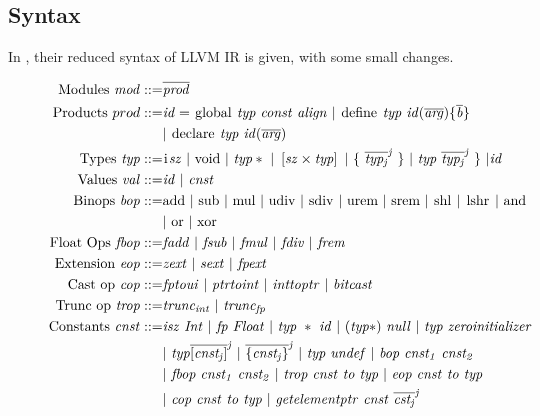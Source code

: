 \newcommand{\kw}[1]{\text{\lsttext{#1}}}
\subsection{Syntax}
In , their reduced syntax of LLVM IR is given, with some small changes.\begin{figure}[!htb]
\begin{align*}
\begin{aligned}
\text{Modules }\mathit{mod} ::= &\overline{\mathit{prod}} \\
\text{Products }prod ::= & \mathit{id =\ }\kw{global}\ \mathit{typ}\ \mathit{const}\ \mathit{align}\ |\ \kw{define} \mathit{\ typ\ id(\overline{arg})\{\overline{b}\}}\\
&|\ \kw{declare} \mathit{\ typ\ id(\overline{arg})} \\
\text{Types } \mathit{typ} ::= &\kw{i} \mathit{sz\ |\ } \kw{void} \mathit{\ |\ typ*\ |\ \left[sz \times typ\right]\ |\ \lbrace\ \overline{typ_{j}}^{j}\ \rbrace\ |\ typ\ \overline{typ_{j}}^{j}\ \rbrace\ | id} \\
\text{Values } \mathit{val} ::= &\mathit{ id\ |\ cnst} \\
\text{Binops } \mathit{bop} ::= &\kw{add} \ |\ \kw{sub}\ |\ \kw{mul}\ |\ \kw{udiv}\ |\ \kw{sdiv}\ |\ \kw{urem}\ |\ \kw{srem}\ |\ \kw{shl}\ |\ \kw{lshr}\ |\ \kw{and}\\
&|\ \kw{or}\ |\ \kw{xor} \\
\text{Float Ops } \mathit{fbop} ::= &\mathit{fadd \ |\ fsub \ |\ fmul \ |\ fdiv \ |\ frem} \\
\text{Extension } \mathit{eop} ::= &\mathit{zext \ |\ sext \ |\ fpext} \\
\text{Cast op } \mathit{cop} ::= &\mathit{fptoui \ |\ ptrtoint \ |\ inttoptr \ |\ bitcast} \\
\text{Trunc op } \mathit{trop} ::= &\mathit{trunc_{int} \ |\ trunc_{fp}} \\
%
%
\text{Constants } \mathit{cnst} ::= &\mathit{isz\ Int\ |\ fp\ Float\ |\ typ\ *\ id\ |\ (typ*)\ null\ |\ typ\ zeroinitializer} \\
&\mathit{|\ typ\overline{[cnst_{j}]}^{j}\ |\ \overline{\lbrace cnst_{j} \rbrace}^{j}\ |\ typ\ undef\ |\ bop\ cnst_{1}\ cnst_{2}} \\
&\mathit{|\ fbop\ cnst_{1}\ cnst_{2}\ |\ trop\ cnst\ to\ typ\ |\ eop\ cnst\ to\ typ}\\
&\mathit{|\ cop\ cnst\ to\ typ\ |\ getelementptr\ cnst\ \overline{cst_{j}}^{j}}\\

\end{aligned}
\end{align*}
\end{figure}

